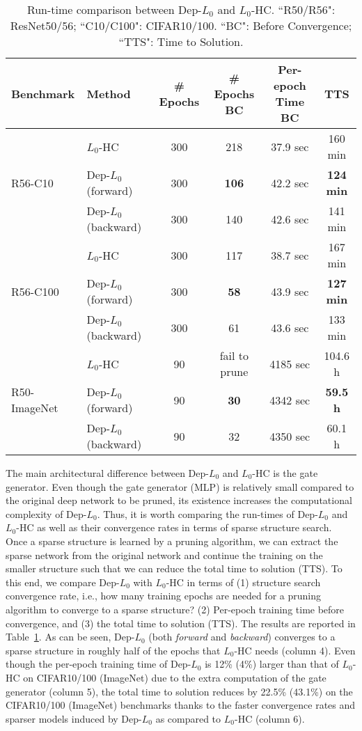 \documentclass[runningheads, envcountsame, a4paper]{llncs}
\begin{document}
\begin{table}[ht]
  \small
  \centering
  \caption{Run-time comparison between Dep-$L_0$ and $L_0$-HC. ``R50/R56": ResNet50/56; ``C10/C100": CIFAR10/100. ``BC": Before Convergence; ``TTS": Time to Solution.}

  \begin{tabular}{l l c c c c}\toprule
      Benchmark & Method & \# Epochs & \# Epochs BC & Per-epoch Time BC & TTS\\ 
      \hline
      & $L_0$-HC & 300 & 218 & 37.9 sec & 160 min\\ 
      R56-C10 & Dep-$L_0$ (forward) & 300 & \textbf{106} & 42.2 sec & \textbf{124 min} \\
      &  Dep-$L_0$ (backward) & 300 & 140 &42.6 sec & 141 min \\
      \hline
      & $L_0$-HC & 300 & 117 & 38.7 sec & 167 min \\
      R56-C100 & Dep-$L_0$ (forward) & 300 & \textbf{58} & 43.9 sec & \textbf{127 min}  \\
      & Dep-$L_0$ (backward) & 300 & 61 &43.6 sec & 133 min \\
      \hline
      & $L_0$-HC & 90 & fail to prune & 4185 sec & 104.6 h\\
      R50-ImageNet & Dep-$L_0$ (forward) & 90 & \textbf{30} &4342 sec & \textbf{59.5 h} \\
      & Dep-$L_0$ (backward) & 90 & 32 & 4350 sec &  60.1 h\\
      \bottomrule
  \end{tabular}
  \label{tab: converge}
\end{table}

The main architectural difference between Dep-$L_0$ and $L_0$-HC is the gate generator. Even though the gate generator (MLP) is relatively small compared to the original deep network to be pruned, its existence increases the computational complexity of Dep-$L_0$. Thus, it is worth comparing the run-times of Dep-$L_0$ and $L_0$-HC as well as their convergence rates in terms of sparse structure search. Once a sparse structure is learned by a pruning algorithm, we can extract the sparse network from the original network and continue the training on the smaller structure such that we can reduce the total time to solution (TTS). To this end, we compare Dep-$L_0$ with $L_0$-HC in terms of (1) structure search convergence rate, i.e., how many training epochs are needed for a pruning algorithm to converge to a sparse structure? (2) Per-epoch training time before convergence, and (3) the total time to solution (TTS). The results are reported in Table~\ref{tab: converge}. As can be seen, Dep-$L_0$ (both \textit{forward} and \textit{backward}) converges to a sparse structure in roughly half of the epochs that $L_0$-HC needs (column 4). Even though the per-epoch training time of Dep-$L_0$ is 12\% (4\%) larger than that of $L_0$-HC on CIFAR10/100 (ImageNet) due to the extra computation of the gate generator (column 5), the total time to solution reduces by 22.5\% (43.1\%) on the CIFAR10/100 (ImageNet) benchmarks thanks to the faster convergence rates and sparser models induced by Dep-$L_0$ as compared to $L_0$-HC (column 6).
\end{document}
